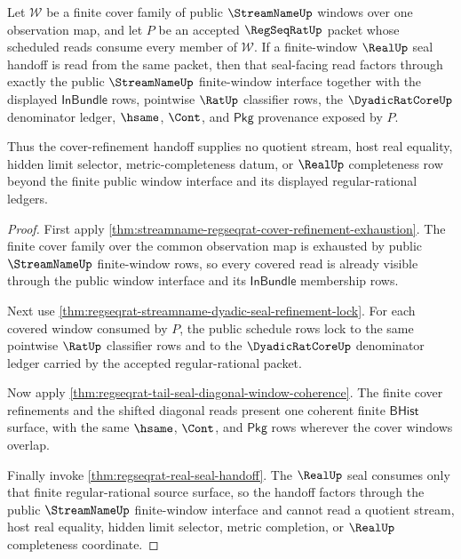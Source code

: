 \begin{theorem}
\label{thm:regseqrat-streamname-cover-refinement-seal-handoff}
Let $\mathcal W$ be a finite cover family of public $\StreamNameUp$ windows
over one observation map, and let $P$ be an accepted $\RegSeqRatUp$ packet
whose scheduled reads consume every member of $\mathcal W$. If a finite-window
$\RealUp$ seal handoff is read from the same packet, then that seal-facing
read factors through exactly the public $\StreamNameUp$ finite-window
interface together with the displayed $\mathsf{InBundle}$ rows, pointwise
$\RatUp$ classifier rows, the $\DyadicRatCoreUp$ denominator ledger, $\hsame$,
$\Cont$, and $\mathsf{Pkg}$ provenance exposed by $P$.

Thus the cover-refinement handoff supplies no quotient stream, host real
equality, hidden limit selector, metric-completeness datum, or $\RealUp$
completeness row beyond the finite public window interface and its displayed
regular-rational ledgers.
\end{theorem}
\begin{proof}
First apply
\autoref{thm:streamname-regseqrat-cover-refinement-exhaustion}. The finite
cover family over the common observation map is exhausted by public
$\StreamNameUp$ finite-window rows, so every covered read is already visible
through the public window interface and its $\mathsf{InBundle}$ membership
rows.

Next use \autoref{thm:regseqrat-streamname-dyadic-seal-refinement-lock}. For
each covered window consumed by $P$, the public schedule rows lock to the
same pointwise $\RatUp$ classifier rows and to the
$\DyadicRatCoreUp$ denominator ledger carried by the accepted regular-rational
packet.

Now apply \autoref{thm:regseqrat-tail-seal-diagonal-window-coherence}. The
finite cover refinements and the shifted diagonal reads present one coherent
finite $\mathsf{BHist}$ surface, with the same $\hsame$, $\Cont$, and
$\mathsf{Pkg}$ rows wherever the cover windows overlap.

Finally invoke \autoref{thm:regseqrat-real-seal-handoff}. The $\RealUp$ seal
consumes only that finite regular-rational source surface, so the handoff
factors through the public $\StreamNameUp$ finite-window interface and cannot
read a quotient stream, host real equality, hidden limit selector, metric
completion, or $\RealUp$ completeness coordinate.
\end{proof}


